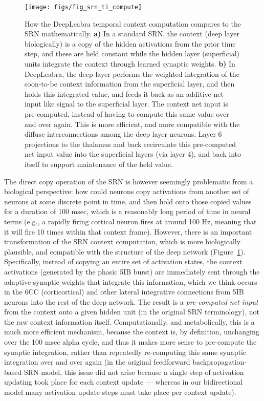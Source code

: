 \documentclass[12pt,twoside]{article}
\newif\myifpdf
\begin{document}
\begin{figure}
  \centering\texttt{[image: figs/fig\_srn\_ti\_compute]}
  \caption{ How the DeepLeabra temporal context computation compares to the SRN mathematically. {\bf a)} In a standard SRN, the context (deep layer biologically) is a copy of the hidden activations from the prior time step, and these are held constant while the hidden layer (superficial) units integrate the context through learned synaptic weights.  {\bf b)} In DeepLeabra, the deep layer performs the weighted integration of the soon-to-be context information from the superficial layer, and then holds this integrated value, and feeds it back as an additive net-input like signal to the superficial layer.  The context net input is pre-computed, instead of having to compute this same value over and over again.  This is more efficient, and more compatible with the diffuse interconnections among the deep layer neurons.  Layer 6 projections to the thalamus and back recirculate this pre-computed net input value into the superficial layers (via layer 4), and back into itself to support maintenance of the held value.}
  \label{fig.srn_vs_ti}
\end{figure}

The direct copy operation of the SRN is however seemingly problematic from a biological perspective: how could neurons copy activations from another set of neurons at some discrete point in time, and then hold onto those copied values for a duration of 100 msec, which is a reasonably long period of time in neural terms (e.g., a rapidly firing cortical neuron fires at around 100 Hz, meaning that it will fire 10 times within that context frame).  However, there is an important transformation of the SRN context computation, which is more biologically plausible, and compatible with the structure of the deep network (Figure~\ref{fig.srn_vs_ti}). Specifically, instead of copying an entire set of activation states, the context activations (generated by the phasic 5IB burst) are immediately sent through the adaptive synaptic weights that integrate this information, which we think occurs in the 6CC (corticortical) and other lateral integrative connections from 5IB neurons into the rest of the deep network.  The result is a {\em pre-computed net input} from the context onto a given hidden unit (in the original SRN terminology), not the raw context information itself.  Computationally, and metabolically, this is a much more efficient mechanism, because the context is, by definition, unchanging over the 100 msec alpha cycle, and thus it makes more sense to pre-compute the synaptic integration, rather than repeatedly re-computing this same synaptic integration over and over again (in the original feedforward backpropagation-based SRN model, this issue did not arise because a single step of activation updating took place for each context update --- whereas in our bidirectional model many activation update steps must take place per context update).
\end{document}
